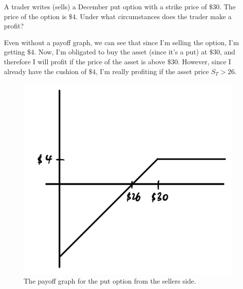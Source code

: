 \documentclass{article}
\begin{document}
      \begin{exercise}[Hull 1.16]
        A trader writes (sells) a December put option with a strike price of $\$30$. The price of the option is $\$4$. Under what circumstances does the trader make a profit? 
      \end{exercise}
      \begin{solution}
        Even without a payoff graph, we can see that since I'm selling the option, I'm getting $\$4$. Now, I'm obligated to buy the asset (since it's a put) at $\$30$, and therefore I will profit if the price of the asset is above $\$30$. However, since I already have the cushion of $\$4$, I'm really profiting if the asset price $S_T > 26$. 
        \begin{figure}[H]
          \centering 
          \includegraphics[scale=0.2]{img/ex1-16.png}
          \caption{The payoff graph for the put option from the sellers side.} 
          \label{fig:ex1-16}
        \end{figure}
      \end{solution}
\end{document}

